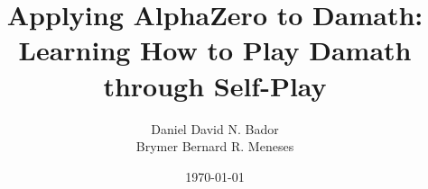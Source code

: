 \documentclass{report}
\title{Applying AlphaZero to Damath: Learning How to Play Damath through Self-Play}
\author{Daniel David N. Bador \\ Brymer Bernard R. Meneses}
\date{\today}
\begin{document}
\maketitle




\tableofcontents

\listoffigures
\listoftables
\listofalgorithms












\end{document}

